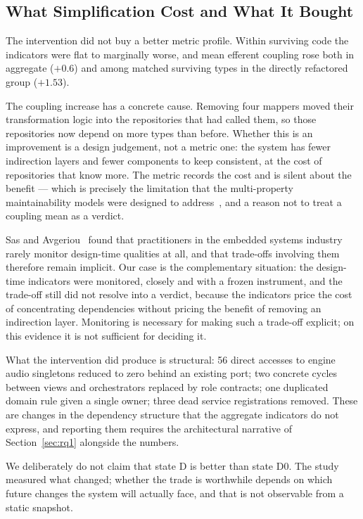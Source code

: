\documentclass{sbc2019}%
\begin{document}
\subsection{What Simplification Cost and What It Bought}

The intervention did not buy a better metric profile. Within surviving code the
indicators were flat to marginally worse, and mean efferent coupling rose both
in aggregate ($+0.6$) and among matched surviving types in the directly
refactored group ($+1.53$).

The coupling increase has a concrete cause. Removing four mappers moved their
transformation logic into the repositories that had called them, so those
repositories now depend on more types than before. Whether this is an
improvement is a design judgement, not a metric one: the system has fewer
indirection layers and fewer components to keep consistent, at the cost of
repositories that know more. The metric records the cost and is silent about the
benefit --- which is precisely the limitation that the multi-property
maintainability models were designed to address~\cite{heitlager2007,baggen2012},
and a reason not to treat a coupling mean as a verdict.

Sas and Avgeriou~\cite{sas2020} found that practitioners in the embedded systems
industry rarely monitor design-time qualities at all, and that trade-offs
involving them therefore remain implicit. Our case is the complementary
situation: the design-time indicators were monitored, closely and with a frozen
instrument, and the trade-off still did not resolve into a verdict, because the
indicators price the cost of concentrating dependencies without pricing the
benefit of removing an indirection layer. Monitoring is necessary for making such
a trade-off explicit; on this evidence it is not sufficient for deciding it.

What the intervention did produce is structural: 56 direct accesses to engine
audio singletons reduced to zero behind an existing port; two concrete cycles
between views and orchestrators replaced by role contracts; one duplicated
domain rule given a single owner; three dead service registrations removed. These
are changes in the dependency structure that the aggregate indicators do not
express, and reporting them requires the architectural narrative of
Section~\ref{sec:rq1} alongside the numbers.

We deliberately do not claim that state D is better than state D0. The study
measured what changed; whether the trade is worthwhile depends on which future
changes the system will actually face, and that is not observable from a static
snapshot.
\end{document}
